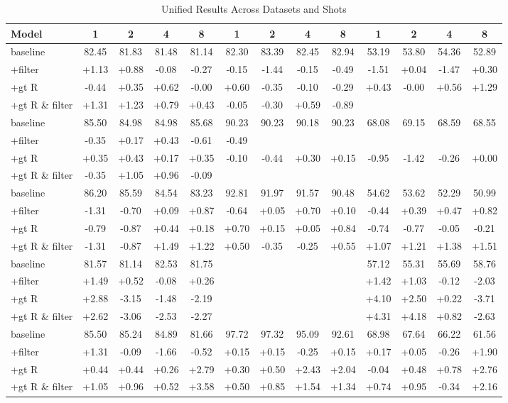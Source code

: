 \begin{table}
\caption{Unified Results Across Datasets and Shots}
\label{tab:all_results}
\begin{tabular}{lcccccccccccc}
\toprule
Model & 1 & 2 & 4 & 8 & 1 & 2 & 4 & 8 & 1 & 2 & 4 & 8 \\
\midrule
baseline & 82.45 & 81.83 & 81.48 & 81.14 & 82.30 & 83.39 & 82.45 & 82.94 & 53.19 & 53.80 & 54.36 & 52.89 \\
+filter & +1.13 & +0.88 & -0.08 & -0.27 & -0.15 & -1.44 & -0.15 & -0.49 & -1.51 & +0.04 & -1.47 & +0.30 \\
+gt R & -0.44 & +0.35 & +0.62 & -0.00 & +0.60 & -0.35 & -0.10 & -0.29 & +0.43 & -0.00 & +0.56 & +1.29 \\
+gt R \& filter & +1.31 & +1.23 & +0.79 & +0.43 & -0.05 & -0.30 & +0.59 & -0.89 &  &  &  &  \\
baseline & 85.50 & 84.98 & 84.98 & 85.68 & 90.23 & 90.23 & 90.18 & 90.23 & 68.08 & 69.15 & 68.59 & 68.55 \\
+filter & -0.35 & +0.17 & +0.43 & -0.61 & -0.49 &  &  &  &  &  &  &  \\
+gt R & +0.35 & +0.43 & +0.17 & +0.35 & -0.10 & -0.44 & +0.30 & +0.15 & -0.95 & -1.42 & -0.26 & +0.00 \\
+gt R \& filter & -0.35 & +1.05 & +0.96 & -0.09 &  &  &  &  &  &  &  &  \\
baseline & 86.20 & 85.59 & 84.54 & 83.23 & 92.81 & 91.97 & 91.57 & 90.48 & 54.62 & 53.62 & 52.29 & 50.99 \\
+filter & -1.31 & -0.70 & +0.09 & +0.87 & -0.64 & +0.05 & +0.70 & +0.10 & -0.44 & +0.39 & +0.47 & +0.82 \\
+gt R & -0.79 & -0.87 & +0.44 & +0.18 & +0.70 & +0.15 & +0.05 & +0.84 & -0.74 & -0.77 & -0.05 & -0.21 \\
+gt R \& filter & -1.31 & -0.87 & +1.49 & +1.22 & +0.50 & -0.35 & -0.25 & +0.55 & +1.07 & +1.21 & +1.38 & +1.51 \\
baseline & 81.57 & 81.14 & 82.53 & 81.75 &  &  &  &  & 57.12 & 55.31 & 55.69 & 58.76 \\
+filter & +1.49 & +0.52 & -0.08 & +0.26 &  &  &  &  & +1.42 & +1.03 & -0.12 & -2.03 \\
+gt R & +2.88 & -3.15 & -1.48 & -2.19 &  &  &  &  & +4.10 & +2.50 & +0.22 & -3.71 \\
+gt R \& filter & +2.62 & -3.06 & -2.53 & -2.27 &  &  &  &  & +4.31 & +4.18 & +0.82 & -2.63 \\
baseline & 85.50 & 85.24 & 84.89 & 81.66 & 97.72 & 97.32 & 95.09 & 92.61 & 68.98 & 67.64 & 66.22 & 61.56 \\
+filter & +1.31 & -0.09 & -1.66 & -0.52 & +0.15 & +0.15 & -0.25 & +0.15 & +0.17 & +0.05 & -0.26 & +1.90 \\
+gt R & +0.44 & +0.44 & +0.26 & +2.79 & +0.30 & +0.50 & +2.43 & +2.04 & -0.04 & +0.48 & +0.78 & +2.76 \\
+gt R \& filter & +1.05 & +0.96 & +0.52 & +3.58 & +0.50 & +0.85 & +1.54 & +1.34 & +0.74 & +0.95 & -0.34 & +2.16 \\
\bottomrule
\end{tabular}
\end{table}
